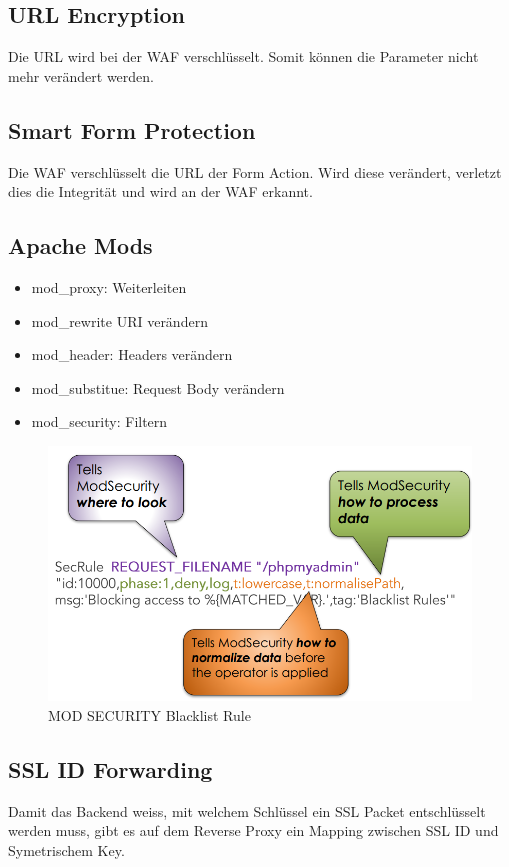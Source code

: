 \subsection{URL Encryption}
Die URL wird bei der WAF verschlüsselt. Somit können die Parameter nicht mehr verändert werden.

\subsection{Smart Form Protection}
Die WAF verschlüsselt die URL der Form Action. Wird diese verändert, verletzt dies die Integrität und wird an der WAF erkannt.

\subsection{Apache Mods}
\begin{itemize}
	\item mod\_proxy: Weiterleiten
	\item mod\_rewrite URI verändern
	\item mod\_header: Headers verändern
	\item mod\_substitue: Request Body verändern
	\item mod\_security: Filtern
\end{itemize}

\begin{figure}[h!]
	\centering
	\includegraphics[width=0.7\linewidth]{images/mod_security_blaclist}
	\caption{MOD SECURITY Blacklist Rule}
	\label{fig:modsecurityblaclist}
\end{figure}



\subsection{SSL ID Forwarding}
Damit das Backend weiss, mit welchem Schlüssel ein SSL Packet entschlüsselt werden muss, gibt es auf dem Reverse Proxy ein Mapping zwischen SSL ID und Symetrischem Key. 

